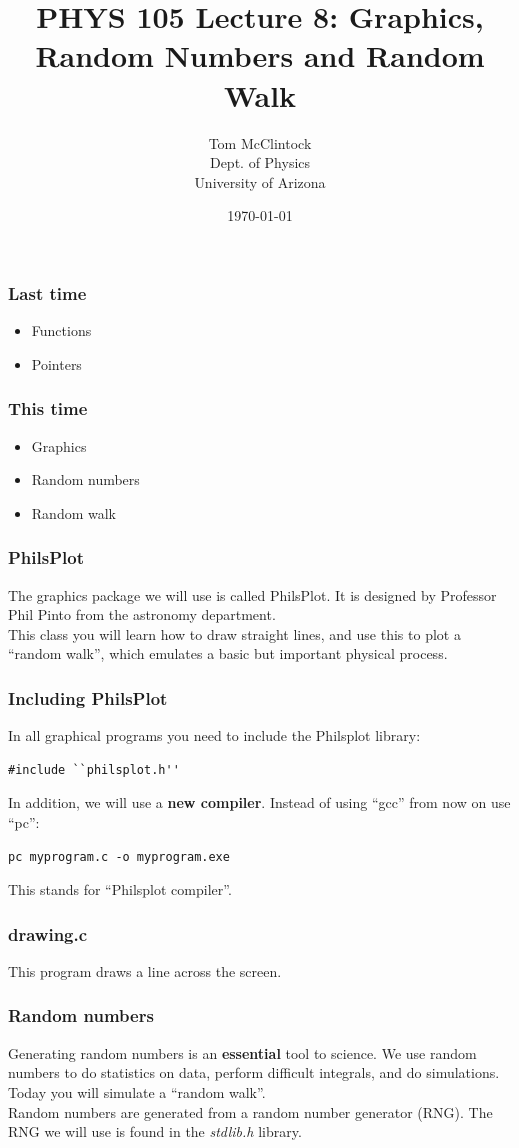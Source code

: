 \documentclass{beamer}
\title{PHYS 105 Lecture 8: Graphics, Random Numbers and Random Walk}
\author{Tom McClintock \\
	Dept. of Physics\\
	University of Arizona
}
\date{\today}
\begin{document}
\begin{frame}
  \titlepage
\end{frame}

\begin{frame}
  \frametitle{Last time}
  \begin{itemize}
    \item Functions
    \item Pointers
  \end{itemize}
\end{frame}

\begin{frame}
  \frametitle{This time}
  \begin{itemize}
    \item Graphics
    \item Random numbers
    \item Random walk
  \end{itemize}
\end{frame}

\begin{frame}[fragile]
  \frametitle{PhilsPlot}
  The graphics package we will use is called PhilsPlot. It is designed by
  Professor Phil Pinto from the astronomy department.\\
  This class you will learn how to draw straight lines, and use this
  to plot a ``random walk'', which emulates a basic but important physical
  process.
\end{frame}

\begin{frame}[fragile]
  \frametitle{Including PhilsPlot}
  In all graphical programs you need to include the Philsplot library:
  \begin{lstlisting}[style=customc]
    #include ``philsplot.h''
  \end{lstlisting}
  In addition, we will use a \textbf{new compiler}. Instead of using 
  ``gcc'' from now on use ``pc'':
  \begin{lstlisting}[style=custombash]
    pc myprogram.c -o myprogram.exe
  \end{lstlisting}
  This stands for ``Philsplot compiler''.
\end{frame}

\begin{frame}
  \frametitle{drawing.c}
  This program draws a line across the screen.
  
\end{frame}

\begin{frame}
  \frametitle{Random numbers}
  Generating random numbers is an \textbf{essential} tool to
  science. We use random numbers to do statistics on data,
  perform difficult integrals, and do simulations.\\
  Today you will simulate a ``random walk''.\\
  Random numbers are generated from a random number generator (RNG).
  The RNG we will use is found in the \textit{stdlib.h} library.
\end{frame}
\end{document}
